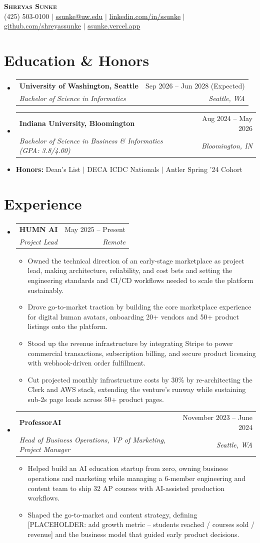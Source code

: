 \documentclass[letterpaper,11pt]{article}
\makeatletter
\newcommand{\resumeItem}[1]{\item\small{#1 \vspace{-2pt}}}
\newcommand{\resumeSubheading}[4]{\vspace{-2pt}\item\begin{tabular*}{0.97\textwidth}[t]{l@{\extracolsep{\fill}}r}\textbf{#1} & #2 \\\textit{\small#3} & \textit{\small #4} \\\end{tabular*}\vspace{-7pt}}
\newcommand{\resumeSubHeadingListStart}{\begin{itemize}[leftmargin=0.15in, label={}]}
\newcommand{\resumeSubHeadingListEnd}{\end{itemize}}
\newcommand{\resumeItemListStart}{\begin{itemize}}
\newcommand{\resumeItemListEnd}{\end{itemize}\vspace{-5pt}}
\makeatother
\begin{document}
\begin{center}
    \textbf{\Huge \scshape Shreyas Sunke} \\ \vspace{1pt}
    \small (425) 503-0100 $|$ \href{mailto:ssunke@uw.edu}{ssunke@uw.edu} $|$
    \href{https://linkedin.com/in/ssunke}{linkedin.com/in/ssunke} $|$
    \href{https://github.com/shreyassunke}{github.com/shreyassunke} $|$
    \href{https://ssunke.vercel.app/}{ssunke.vercel.app}
\end{center}

\section{Education \& Honors}
  \resumeSubHeadingListStart
    \resumeSubheading
      {University of Washington, Seattle}{Sep 2026 -- Jun 2028 (Expected)}
      {Bachelor of Science in Informatics}{Seattle, WA}
    \resumeSubheading
      {Indiana University, Bloomington}{Aug 2024 -- May 2026}
      {Bachelor of Science in Business \& Informatics (GPA: 3.8/4.00)}{Bloomington, IN}
    \item \small{\textbf{Honors:} Dean's List $|$ DECA ICDC Nationals $|$ Antler Spring '24 Cohort}
  \resumeSubHeadingListEnd

\section{Experience}
  \resumeSubHeadingListStart
    \resumeSubheading
      {HUMN AI}{May 2025 -- Present}
      {Project Lead}{Remote}
      \resumeItemListStart
        \resumeItem{Owned the technical direction of an early-stage marketplace as project lead, making architecture, reliability, and cost bets and setting the engineering standards and CI/CD workflows needed to scale the platform sustainably.}
        \resumeItem{Drove go-to-market traction by building the core marketplace experience for digital human avatars, onboarding 20+ vendors and 50+ product listings onto the platform.}
        \resumeItem{Stood up the revenue infrastructure by integrating Stripe to power commercial transactions, subscription billing, and secure product licensing with webhook-driven order fulfillment.}
        \resumeItem{Cut projected monthly infrastructure costs by 30\% by re-architecting the Clerk and AWS stack, extending the venture's runway while sustaining sub-2s page loads across 50+ product pages.}
      \resumeItemListEnd
    \resumeSubheading
      {ProfessorAI}{November 2023 -- June 2024}
      {Head of Business Operations, VP of Marketing, Project Manager}{Seattle, WA}
      \resumeItemListStart
        \resumeItem{Helped build an AI education startup from zero, owning business operations and marketing while managing a 6-member engineering and content team to ship 32 AP courses with AI-assisted production workflows.}
        \resumeItem{Shaped the go-to-market and content strategy, defining [PLACEHOLDER: add growth metric -- students reached / courses sold / revenue] and the business model that guided early product decisions.}
      \resumeItemListEnd
  \resumeSubHeadingListEnd
\end{document}

